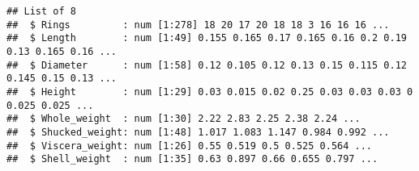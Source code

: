 \documentclass[
]{article}
\newenvironment{Shaded}{\begin{snugshade}}{\end{snugshade}}
\newcommand{\ControlFlowTok}[1]{\textcolor[rgb]{0.13,0.29,0.53}{\textbf{#1}}}
\newcommand{\DataTypeTok}[1]{\textcolor[rgb]{0.13,0.29,0.53}{#1}}
\newcommand{\DecValTok}[1]{\textcolor[rgb]{0.00,0.00,0.81}{#1}}
\newcommand{\KeywordTok}[1]{\textcolor[rgb]{0.13,0.29,0.53}{\textbf{#1}}}
\newcommand{\NormalTok}[1]{#1}
\newcommand{\OperatorTok}[1]{\textcolor[rgb]{0.81,0.36,0.00}{\textbf{#1}}}
\newcommand{\OtherTok}[1]{\textcolor[rgb]{0.56,0.35,0.01}{#1}}
\newcommand{\StringTok}[1]{\textcolor[rgb]{0.31,0.60,0.02}{#1}}
\begin{document}
\begin{verbatim}
## List of 8
##  $ Rings         : num [1:278] 18 20 17 20 18 18 3 16 16 16 ...
##  $ Length        : num [1:49] 0.155 0.165 0.17 0.165 0.16 0.2 0.19 0.13 0.165 0.16 ...
##  $ Diameter      : num [1:58] 0.12 0.105 0.12 0.13 0.15 0.115 0.12 0.145 0.15 0.13 ...
##  $ Height        : num [1:29] 0.03 0.015 0.02 0.25 0.03 0.03 0.03 0 0.025 0.025 ...
##  $ Whole_weight  : num [1:30] 2.22 2.83 2.25 2.38 2.24 ...
##  $ Shucked_weight: num [1:48] 1.017 1.083 1.147 0.984 0.992 ...
##  $ Viscera_weight: num [1:26] 0.55 0.519 0.5 0.525 0.564 ...
##  $ Shell_weight  : num [1:35] 0.63 0.897 0.66 0.655 0.797 ...
\end{verbatim}

\begin{Shaded}
\end{Shaded}

\begin{Shaded}
\end{Shaded}
\end{document}
